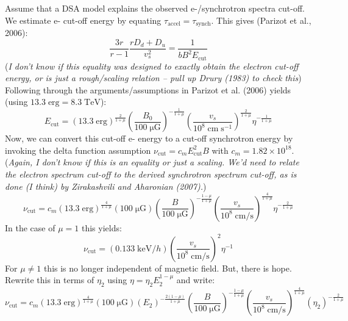 \documentclass[iop, apj, numberedappendix]{emulateapj}
\newcommand*{\mt}{\mathrm}
\newcommand*{\unit}[1]{\;\mt{#1}}  %
\newcommand*{\Ecut}{E_{\mt{cut}}}
\newcommand*{\muG}{\unit{\mu G}}
\begin{document}
Assume that a DSA model explains the observed e-/synchrotron spectra
cut-off.  We estimate e- cut-off energy by equating
$\tau_{\mt{accel}} = \tau_{\mt{synch}}$.  This gives (Parizot et al., 2006):
\begin{equation}
    \frac{3r}{r-1} \frac{r D_d + D_u}{v_s^2} = \frac{1}{b B^2 \Ecut}
\end{equation}
(\emph{I don't know if this equality was designed to exactly obtain the electron
cut-off energy, or is just a rough/scaling relation -- pull up Drury (1983) to
check this})
Following through the arguments/assumptions in Parizot et al. (2006) yields
(using $13.3 \unit{erg} = 8.3 \unit{TeV}$):
\begin{equation}
    \Ecut =
        \left( 13.3 \unit{erg} \right)^{\frac{2}{1+\mu}}
        \left( \frac{B_0}{100 \muG} \right)^{-\frac{1}{1+\mu}}
        \left( \frac{v_s}{10^8 \unit{cm\;s^{-1}}} \right)^{\frac{2}{1+\mu}}
        \eta^{-\frac{1}{1+\mu}}
\end{equation}
Now, we can convert this cut-off e- energy to a cut-off synchrotron energy by
invoking the delta function assumption $\nu_{\mt{cut}} = c_m \Ecut^2 B$ with
$c_m = 1.82 \times 10^{18}$.
(\emph{Again, I don't know if this is an equality or just a scaling.  We'd need
to relate the electron spectrum cut-off to the derived synchrotron spectrum
cut-off, as is done (I think) by Zirakashvili and Aharonian (2007).})
\begin{equation}
    \nu_{\mt{cut}} = c_m
        \left( 13.3 \unit{erg} \right)^{\frac{4}{1+\mu}}
        \left( 100 \muG \right)
        \left( \frac{B}{100\muG} \right)^{-\frac{1-\mu}{1+\mu}}
        \left( \frac{v_s}{10^8 \unit{cm/s}} \right)^{\frac{4}{1+\mu}}
        \eta^{-\frac{2}{1+\mu}}
\end{equation}
In the case of $\mu = 1$ this yields:
\begin{equation}
    \nu_{\mt{cut}} = (0.133 \unit{keV} / h)
        \left( \frac{v_s}{10^8 \unit{cm/s}} \right)^{2}
        \eta^{-1}
\end{equation}
For $\mu \neq 1$ this is no longer independent of magnetic field.  But,
there is hope.  Rewrite this in terms of $\eta_2$ using
$\eta = \eta_2 E_2^{1-\mu}$ and write:
\[
    \nu_{\mt{cut}} = c_m
        \left( 13.3 \unit{erg} \right)^{\frac{4}{1+\mu}}
        \left( 100 \muG \right)
        \left( E_2 \right)^{-\frac{2(1-\mu)}{1+\mu}}
        \left( \frac{B}{100\muG} \right)^{-\frac{1-\mu}{1+\mu}}
        \left( \frac{v_s}{10^8 \unit{cm/s}} \right)^{\frac{4}{1+\mu}}
        \left( \eta_2 \right)^{-\frac{2}{1+\mu}}
\]
\end{document}
